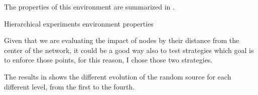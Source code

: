 The properties of this environment are summarized in .

\begin{table}[h]
	
	\caption{Hierarchical experiments environment properties}
	\label{tbl:hierarchical_properties}
\end{table}

Given that we are evaluating the impact of nodes by their distance from
the center of the network, it could be a good way also to test strategies
which goal is to enforce those points, for this reason, I chose those two
strategies.

The results in  shows the different evolution of
the random source for each different level, from the first to the fourth.

